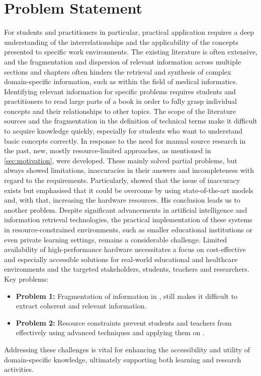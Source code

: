 \section{Problem Statement}\label{sec:problem statement}
For students and practitioners in particular, practical application requires a deep understanding of the interrelationships and the applicability of the concepts presented to specific work environments.
The existing literature is often extensive, and the fragmentation and dispersion of relevant information across multiple sections and chapters often hinders the retrieval and synthesis of complex domain-specific information, such as within the field of medical informatics.
Identifying relevant information for specific problems requires students and practitioners to read large parts of a book in order to fully grasp individual concepts and their relationships to other topics.
The scope of the literature sources and the fragmentation in the definition of technical terms make it difficult to acquire knowledge quickly, especially for students who want to understand basic concepts correctly.
%
In response to the need for manual source research in the past, new, mostly resource-limited approaches, as mentioned in \cref{sec:motivation}, were developed. 
These mainly solved partial problems, but always showed limitations, inaccuracies in their answers and incompleteness with regard to the requirements. 
%
Particularly, \citet{Paul_Keller} showed that the issue of inaccuracy exists but emphasised that it could be overcome by using state-of-the-art models and, with that, increasing the hardware resources. 
His conclusion leads us to another problem.   
Despite significant advancements in artificial intelligence and information retrieval technologies, the practical implementation of these systems in resource-constrained environments, such as smaller educational institutions or even private learning settings, remains a considerable challenge. 
Limited availability of high-performance hardware necessitates a focus on cost-effective and especially accessible solutions for real-world educational and healthcare environments and the targeted stakeholders, students, teachers and researchers.
%
Key problems:
\begin{itemize}
  \item \textbf{Problem 1:} Fragmentation of information in \citet{bb2}, still makes it difficult to extract coherent and relevant information.
  \item \textbf{Problem 2:} Resource constraints prevent students and teachers from effectively using advanced techniques and applying them on \citet{bb2}.
\end{itemize}
%
Addressing these challenges is vital for enhancing the accessibility and utility of domain-specific knowledge, ultimately supporting both learning and research activities. 


